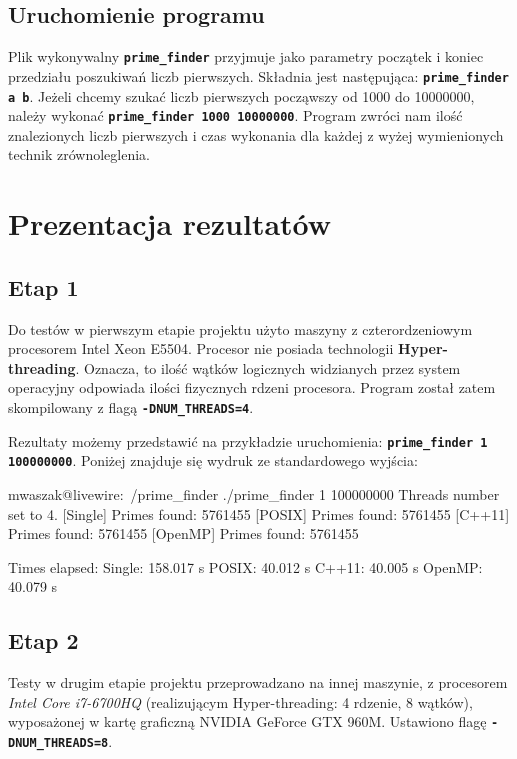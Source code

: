\documentclass[12pt, twoside, hidelinks, a4paper]{article}
\begin{document}
\subsection{Uruchomienie programu}
Plik wykonywalny \textbf{\texttt{prime\_finder}} przyjmuje jako parametry początek i koniec przedziału poszukiwań liczb pierwszych. Składnia jest następująca: \textbf{\texttt{prime\_finder a b}}. Jeżeli chcemy szukać liczb pierwszych począwszy od 1000 do 10000000, należy wykonać \textbf{\texttt{prime\_finder 1000 10000000}}. Program zwróci nam ilość znalezionych liczb pierwszych i czas wykonania dla każdej z wyżej wymienionych technik zrównoleglenia.

\section{Prezentacja rezultatów}

\subsection{Etap 1}

Do testów w pierwszym etapie projektu użyto maszyny z czterordzeniowym procesorem Intel Xeon E5504. Procesor nie posiada technologii \textbf{Hyper-threading}. Oznacza, to ilość wątków logicznych widzianych przez system operacyjny odpowiada ilości fizycznych rdzeni procesora. Program został zatem skompilowany z flagą \textbf{\texttt{-DNUM\_THREADS=4}}.

Rezultaty możemy przedstawić na przykładzie uruchomienia: \textbf{\texttt{prime\_finder 1 100000000}}. Poniżej znajduje się wydruk ze standardowego wyjścia:

\begin{boxedverbatim}
mwaszak@livewire:~/prime_finder ./prime_finder 1 100000000
Threads number set to 4.
[Single] Primes found: 5761455
[POSIX]  Primes found: 5761455
[C++11]  Primes found: 5761455
[OpenMP] Primes found: 5761455

Times elapsed:
Single: 158.017 s
POSIX:  40.012 s
C++11:  40.005 s
OpenMP: 40.079 s
\end{boxedverbatim}

\subsection{Etap 2}

Testy w drugim etapie projektu przeprowadzano na innej maszynie, z procesorem \textit{Intel Core i7-6700HQ} (realizującym Hyper-threading: 4 rdzenie, 8 wątków), wyposażonej w kartę graficzną NVIDIA GeForce GTX 960M. Ustawiono flagę \textbf{\texttt{-DNUM\_THREADS=8}}.
\end{document}
